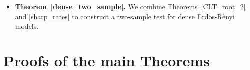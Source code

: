 \documentclass[12pt]{article}
\def\er{ Erd{\"o}s-R{\`e}nyi }
\numberwithin{equation}{section}
\begin{document}
\begin{itemize}
Using Danskin's theorem \cite{danskin1966theory}, we compute the derivative of this limiting function with respect to $\alpha$ at $\alpha=0$, which captures the limiting behavior of the denominator. Since the supremum in the limit is uniquely attained at the constant graphon $u^*$, we obtain:
\begin{equation}
\frac{\sum\limits_{i=1}^{n}\frac{h_{n,i}^2}{m_n^{2v(H)}} e^{-\frac{\lambda^{\circ}}{m_n^{v(H)-2}} h_{n,i}}}{\sum\limits_{i=1}^{n} e^{-\frac{\lambda^{\circ}}{m_n^{v(H)-2}} h_{n,i}}}\xrightarrow{P} \left(\frac{(u^*)^{e(H)}}{|Aut(H)|} - \frac{p_0^{e(H)}}{|Aut(H)|}\right)^2
\label{denom_conv}\end{equation}

Combining the limits of the numerator and denominator yields the stated convergence:
\begin{equation}
m_n^2(\hat{\lambda}_n - \lambda^{\circ}) \xrightarrow{P} \frac{\frac{(u^*)^{e(H)}}{|Aut(H)|} - \frac{p_0^{e(H)}}{|Aut(H)|}}{\left(\frac{(u^*)^{e(H)}}{|Aut(H)|} - \frac{p_0^{e(H)}}{|Aut(H)|}\right)^2} = \frac{1}{\frac{(u^*)^{e(H)}}{|Aut(H)|} - \frac{p_0^{e(H)}}{|Aut(H)|}}.\label{sharp_rates_statement}
\end{equation}


    
    
    \item \textbf{Theorem~\ref{dense_two_sample}.} We combine Theorems~\ref{CLT_root_2} and
    \ref{sharp_rates} to construct a two-sample test for dense \er models.
\end{itemize}

\section{Proofs of the main Theorems \label{sec_proof}}
\end{document}
